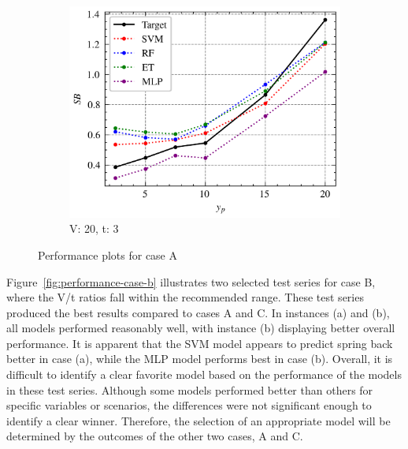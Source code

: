 \begin{figure}[h]
    \begin{tcolorbox}[arc=0pt,boxrule=0.5pt]
        \hfill
        \begin{subfigure}{0.5\textwidth}
            \includegraphics[width=\textwidth]{chap5/images/performance_20_3.0}
            \caption{V: 20, t: 3}
            \label{fig:performance-20-3.0}
        \end{subfigure}
    \end{tcolorbox}
    \caption{Performance plots for case A}
    \label{fig:performance-case-a}
\end{figure}

Figure~\ref{fig:performance-case-b} illustrates two selected test series for case B, where the V/t ratios fall within
the recommended range.
These test series produced the best results compared to cases A and C.
In instances (a) and (b), all models performed reasonably well, with instance (b) displaying better overall
performance.
It is apparent that the SVM model appears to predict spring back better in case (a), while the MLP model performs
best in case (b).
Overall, it is difficult to identify a clear favorite model based on the performance of the models in these test
series. Although some models performed better than others for specific variables or scenarios, the differences were
not significant enough to identify a clear winner. Therefore, the selection of an appropriate model will be
determined by the outcomes of the other two cases, A and C.

